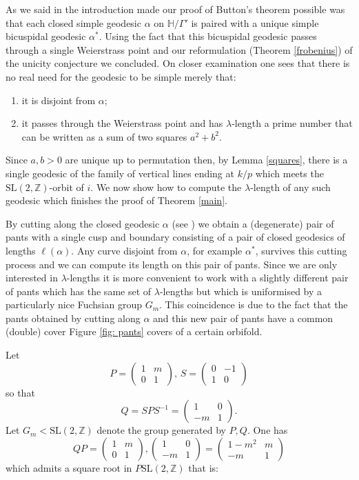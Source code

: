 \documentclass[12pt,a4paper]{amsart}
\def\HH{\mathbb{H}}
\def\xx{\HH/\Gamma'}
\def\ZZ{\mathbb{Z}}
\def\sl2{\mathrm{SL}(2, \ZZ)}
\def\GG{G_m}
\begin{document}
As we said in the introduction made our proof of Button's theorem possible was
that  each closed simple geodesic $\alpha$ on $\xx$ is paired with a unique
simple bicuspidal geodesic $\alpha^*$. Using the fact that this bicuspidal
geodesic passes through a single Weierstrass point and our reformulation
(Theorem \ref{frobenius}) of the unicity conjecture we concluded. On closer
examination one sees that there is no real need for the geodesic to be simple
merely that:

\begin{enumerate}
	\item it is disjoint from $\alpha$;
	\item it passes through the Weierstrass point and has $\lambda$-length
		a prime number that can be written as a sum of two squares  $a^2 + b^2$.
\end{enumerate}

Since $a,b>0$ are unique up to permutation then, by Lemma \ref{squares}, there
is a single  geodesic of the family of vertical lines ending at  $k/p$ which
meets the $\sl2$-orbit of $i$. We now show how to compute the $\lambda$-length
of any such geodesic which finishes the proof of Theorem \ref{main}.

By cutting along the closed geodesic $\alpha$ (see \cite{thesis}) we obtain a
(degenerate) pair of pants with a single cusp and boundary consisting of a pair
of closed geodesics of lengths $\ell(\alpha)$. Any curve disjoint from
$\alpha$, for example $\alpha^*$, survives this cutting process and we can
compute its length on this pair of pants. Since we are only interested in
$\lambda$-lengths it is more convenient to work with a slightly different pair
of pants which has the same set of $\lambda$-lengths but which is uniformised
by a particularly nice Fuchsian group $\GG$. This coincidence is due to the
fact that the pants obtained by cutting along $\alpha$ and this new pair of
pants have a common (double) cover Figure \ref{fig: pants} covers of a certain
orbifold.


Let
$$ P = \begin{pmatrix} 1 & m \\ 0 & 1 \end{pmatrix}, \, 
S = \begin{pmatrix} 0 & -1 \\ 1 & 0 \end{pmatrix} $$
so that 
$$Q = SPS^{-1} =  \begin{pmatrix} 1 & 0 \\ -m & 1 \end{pmatrix}.$$
Let $\GG < \sl2$ denote the group generated by $P,Q$.
One has
$$ QP = 
\begin{pmatrix} 1 & m \\ 0 & 1 \end{pmatrix},\begin{pmatrix} 1 & 0 \\ -m & 1 \end{pmatrix}  
= \begin{pmatrix} 1-m^2 & m \\ -m & 1 \end{pmatrix} $$
which admits a square root in $P\sl2$ that is:
\end{document}
